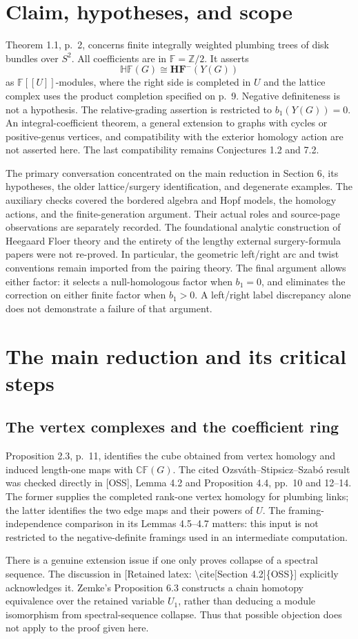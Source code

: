 \documentclass[10pt]{article}
\begin{document}
\section*{Claim, hypotheses, and scope}
Theorem 1.1, p. 2, concerns finite integrally weighted plumbing trees of disk bundles over \(S^2\). All coefficients are in \(\mathbb F=\mathbb Z/2\). It asserts \[\mathbb{HF}(G)\cong \boldsymbol{HF}^{-}(Y(G))\] as \(\mathbb F[[U]]\)-modules, where the right side is completed in \(U\) and the lattice complex uses the product completion specified on p. 9. Negative definiteness is not a hypothesis. The relative-grading assertion is restricted to \(b_1(Y(G))=0\). An integral-coefficient theorem, a general extension to graphs with cycles or positive-genus vertices, and compatibility with the exterior homology action are not asserted here. The last compatibility remains Conjectures 1.2 and 7.2.\par
The primary conversation concentrated on the main reduction in Section 6, its hypotheses, the older lattice/surgery identification, and degenerate examples. The auxiliary checks covered the bordered algebra and Hopf models, the homology actions, and the finite-generation argument. Their actual roles and source-page observations are separately recorded. The foundational analytic construction of Heegaard Floer theory and the entirety of the lengthy external surgery-formula papers were not re-proved. In particular, the geometric left/right arc and twist conventions remain imported from the pairing theory. The final argument allows either factor: it selects a null-homologous factor when \(b_1=0\), and eliminates the correction on either finite factor when \(b_1>0\). A left/right label discrepancy alone does not demonstrate a failure of that argument.\par
\section*{The main reduction and its critical steps}
\subsection*{The vertex complexes and the coefficient ring}
Proposition 2.3, p. 11, identifies the cube obtained from vertex homology and induced length-one maps with \(\mathbb{CF}(G)\). The cited Ozsváth–Stipsicz–Szabó result was checked directly in [OSS], Lemma 4.2 and Proposition 4.4, pp. 10 and 12–14. The former supplies the completed rank-one vertex homology for plumbing links; the latter identifies the two edge maps and their powers of \(U\). The framing-independence comparison in its Lemmas 4.5–4.7 matters: this input is not restricted to the negative-definite framings used in an intermediate computation.\par
There is a genuine extension issue if one only proves collapse of a spectral sequence. The discussion in [Retained latex: \textbackslash{}cite[Section 4.2]\{OSS\}] explicitly acknowledges it. Zemke’s Proposition 6.3 constructs a chain homotopy equivalence over the retained variable \(U_1\), rather than deducing a module isomorphism from spectral-sequence collapse. Thus that possible objection does not apply to the proof given here.\par
\end{document}

